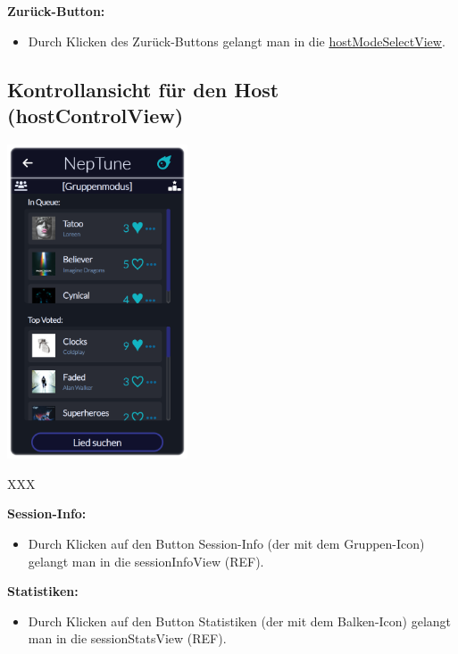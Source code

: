 \documentclass[oneside, ngerman]{sdqtechreport}
\begin{document}
\textbf{Zurück-Button:}
\begin{itemize}
    \item Durch Klicken des Zurück-Buttons gelangt man in die  \hyperlink{hostModeSelectView}{hostModeSelectView}.
\end{itemize}


\subsection{Kontrollansicht für den Host (hostControlView)}
\label{sec:Benutzeroberfläche:hostControlView}


\begin{center}
    \hypertarget{hostControlView}{}
    \includegraphics[width=0.4\textwidth]{LATEX/Pflichtenheft/GraphicDesigns/hostControlPage.png}
\end{center} 
\hfill
\begin{minipage}{0.5\textwidth}
    XXX
\end{minipage}

\textbf{Session-Info:}
\begin{itemize}
    \item Durch Klicken auf den Button Session-Info (der mit dem Gruppen-Icon) gelangt man in die sessionInfoView (REF).
\end{itemize}

\textbf{Statistiken:}
\begin{itemize}
    \item Durch Klicken auf den Button Statistiken (der mit dem Balken-Icon) gelangt man in die sessionStatsView (REF).
\end{itemize}
\end{document}
